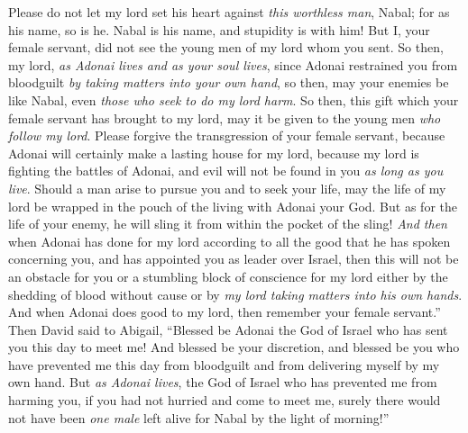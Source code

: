 \begin{biblechapter}
\verse Please do not let my lord set his heart against \textit{this worthless man}, Nabal; for as his name, so is he. Nabal is his name, and stupidity is with him! But I, your female servant, did not see the young men of my lord whom you sent.
\verse So then, my lord, \textit{as Adonai lives and as your soul lives}, since Adonai restrained you from bloodguilt \textit{by taking matters into your own hand}, so then, may your enemies be like Nabal, even \textit{those who seek to do my lord harm}.
\verse So then, this gift which your female servant has brought to my lord, may it be given to the young men \textit{who follow my lord}.
\verse Please forgive the transgression of your female servant, because Adonai will certainly make a lasting house for my lord, because my lord is fighting the battles of Adonai, and evil will not be found in you \textit{as long as you live}.
\verse Should a man arise to pursue you and to seek your life, may the life of my lord be wrapped in the pouch of the living with Adonai your God. But as for the life of your enemy, he will sling it from within the pocket of the sling!
\verse \textit{And then} when Adonai has done for my lord according to all the good that he has spoken concerning you, and has appointed you as leader over Israel,
\verse then this will not be an obstacle for you or a stumbling block of conscience for my lord either by the shedding of blood without cause or by \textit{my lord taking matters into his own hands}. And when Adonai does good to my lord, then remember your female servant.”
\verse Then David said to Abigail, “Blessed be Adonai the God of Israel who has sent you this day to meet me!
\verse And blessed be your discretion, and blessed be you who have prevented me this day from bloodguilt and from delivering myself by my own hand.
\verse But \textit{as Adonai lives}, the God of Israel who has prevented me from harming you, if you had not hurried and come to meet me, surely there would not have been \textit{one male} left alive for Nabal by the light of morning!”

\end{biblechapter}
